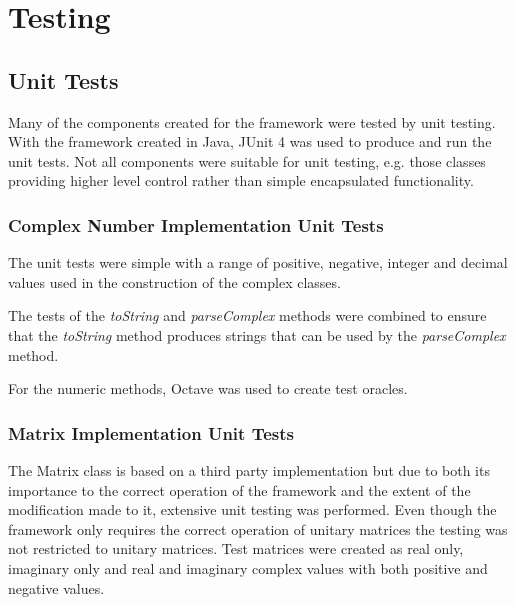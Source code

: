 \chapter{Testing}
\label{sec:testing}
\section{Unit Tests}
\label{sec:unittests}
Many of the components created for the framework were tested by unit testing.
With the framework created in Java, JUnit 4\cite{junitweb} was used to produce and run the unit tests.
Not all components were suitable for unit testing, e.g. those classes providing higher level control rather than simple encapsulated functionality.


\subsection{Complex Number Implementation Unit Tests}
The unit tests were simple with a range of positive, negative, integer and decimal values used in the construction of the complex classes.

The tests of the \emph{toString} and \emph{parseComplex} methods were combined to ensure that the \emph{toString} method produces strings that can be used by the \emph{parseComplex} method.

For the numeric methods, Octave\cite{octweb} was used to create test oracles.

\subsection{Matrix Implementation Unit Tests}
The Matrix class is based on a third party implementation but due to both its importance to the correct operation of the framework and the extent of the modification made to it, extensive unit testing was performed.
Even though the framework only requires the correct operation of unitary matrices the testing was not restricted to unitary matrices.
Test matrices were created as real only,  imaginary only and real and imaginary complex values with both positive and negative values.

